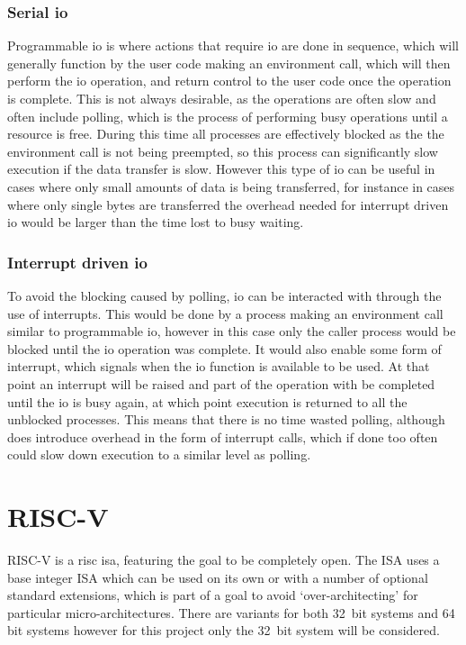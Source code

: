 \subsubsection{Serial \ac{io}}
Programmable \ac{io} is where actions that require \ac{io} are done in sequence, which will generally function by the user code making an environment call, which will then perform the \ac{io} operation, and return control to the user code once the operation is complete. This is not always desirable, as the operations are often slow and often include polling, which is the process of performing busy operations until a resource is free. During this time all processes are effectively blocked as the the environment call is not being preempted, so this process can significantly slow execution if the data transfer is slow. However this type of \ac{io} can be useful in cases where only small amounts of data is being transferred, for instance in cases where only single bytes are transferred the overhead needed for interrupt driven \ac{io} would be larger than the time lost to busy waiting.
\subsubsection{Interrupt driven \ac{io}}
To avoid the blocking caused by polling, \ac{io} can be interacted with through the use of interrupts. This would be done by a process making an environment call similar to programmable \ac{io}, however in this case only the caller process would be blocked until the \ac{io} operation was complete. It would also enable some form of interrupt, which signals when the \ac{io} function is available to be used. At that point an interrupt will be raised and part of the operation with be completed until the \ac{io} is busy again, at which point execution is returned to all the unblocked processes. This means that there is no time wasted polling, although does introduce overhead in the form of interrupt calls, which if done too often could slow down execution to a similar level as polling.
\section{RISC-V}
RISC-V is a \ac{risc} \ac{isa}, featuring the goal to be completely open. The ISA uses a base integer ISA which can be used on its own or with a number of optional standard extensions, which is part of a goal to avoid `over-architecting' for particular micro-architectures. There are variants for both 32~bit systems and 64 bit systems however for this project only the 32~bit system will be considered\cite{riscv_unpriv}.
